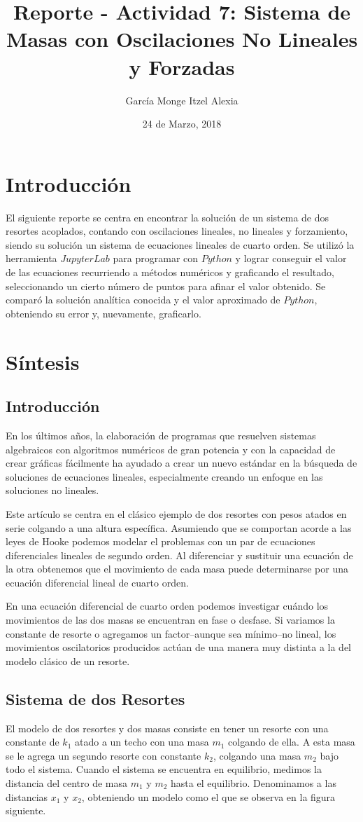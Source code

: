 \documentclass{article}
\title{Reporte - Actividad 7: Sistema de Masas con Oscilaciones No Lineales y Forzadas}
\author{García Monge Itzel Alexia}
\date{24 de Marzo, 2018}
\begin{document}
\maketitle
\section{Introducción}
El siguiente reporte se centra en encontrar la solución de un sistema de dos resortes acoplados, contando con oscilaciones lineales, no lineales y forzamiento, siendo su solución un sistema de ecuaciones lineales de cuarto orden. Se utilizó la herramienta $Jupyter Lab$ para programar con $Python$ y lograr conseguir el valor de las ecuaciones recurriendo a métodos numéricos y graficando el resultado, seleccionando un cierto número de puntos para afinar el valor obtenido. Se comparó la solución analítica conocida y el valor aproximado de $Python$, obteniendo su error y, nuevamente, graficarlo.

\section{Síntesis}
\subsection{Introducción}
En los últimos años, la elaboración de programas que resuelven sistemas algebraicos con algoritmos numéricos de gran potencia y con la capacidad de crear gráficas fácilmente ha ayudado a crear un nuevo estándar en la búsqueda de soluciones de ecuaciones lineales, especialmente creando un enfoque en las soluciones no lineales.

Este artículo se centra en el clásico ejemplo de dos resortes con pesos atados en serie colgando a una altura específica. Asumiendo que se comportan acorde a las leyes de Hooke podemos modelar el problemas con un par de ecuaciones diferenciales lineales de segundo orden. Al diferenciar y sustituir una ecuación de la otra obtenemos que el movimiento de cada masa puede determinarse por una ecuación diferencial lineal de cuarto orden.

En una ecuación diferencial de cuarto orden podemos investigar cuándo los movimientos de las dos masas se encuentran en fase o desfase. Si variamos la constante de resorte o agregamos un factor--aunque sea mínimo--no lineal, los movimientos oscilatorios producidos actúan de una manera muy distinta a la del modelo clásico de un resorte. 

\subsection{Sistema de dos Resortes}
El modelo de dos resortes y dos masas consiste en tener un resorte con una constante de $k_1$ atado a un techo con una masa $m_1$ colgando de ella. A esta masa se le agrega un segundo resorte con constante $k_2$, colgando una masa $m_2$ bajo todo el sistema. Cuando el sistema se encuentra en equilibrio, medimos la distancia del centro de masa $m_1$ y $m_2$ hasta el equilibrio. Denominamos a las distancias $x_1$ y $x_2$, obteniendo un modelo como el que se observa en la figura siguiente.
\end{document}
